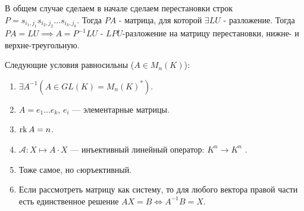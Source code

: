 В общем случае сделаем в начале сделаем перестановки строк $P = s_{i_1,j_1}s_{i_2,j_2}\ldots s_{i_k,j_k}$. Тогда $PA$ - матрица, для которой $\exists LU$ - разложение. Тогда $PA = LU \implies A = P^{-1}LU$ - $LPU$-разложение на матрицу перестановки, нижне- и верхне-треугольную.
\begin{theorem}
    Следующие условия равносильны ($A \in M_n(K)$):
    \begin{enumerate}
        \item $\exists A^{-1} (A \in GL(K) = M_n(K)^*)$.
        \item  $A = e_1 \ldots e_k$, $e_i$ --- элементарные матрицы.
        \item $\operatorname{rk} A = n$.
        \item  $\mathcal{A}\!: X \mapsto A \cdot X$ --- инъективный линейный оператор: $K^n \to K^n$ .
        \item Тоже самое, но cюръективный.
        \item Если рассмотреть матрицу как систему, то для любого вектора правой части есть единственное решение  $AX = B \iff A^{-1}B = X$.
    \end{enumerate}
\end{theorem}